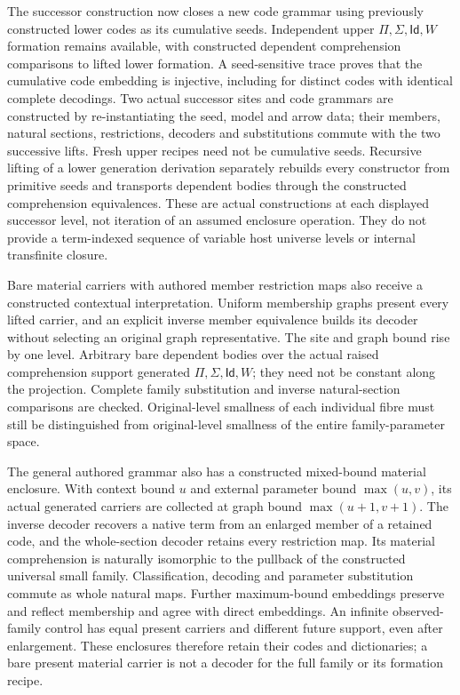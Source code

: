 \documentclass[11pt]{article}
\theoremstyle{definition}
\theoremstyle{remark}
\begin{document}
The successor construction now closes a new code grammar using previously
constructed lower codes as its cumulative seeds.  Independent upper
$\Pi,\Sigma,\mathsf{Id},W$ formation remains available, with constructed
dependent comprehension comparisons to lifted lower formation.  A
seed-sensitive trace proves that the cumulative code embedding is injective,
including for distinct codes with identical complete decodings.  Two actual
successor sites and code grammars are constructed by re-instantiating the
seed, model and arrow data; their members, natural sections, restrictions,
decoders and substitutions commute with the two successive lifts.  Fresh
upper recipes need not be cumulative seeds.  Recursive lifting of a lower
generation derivation separately rebuilds every constructor from primitive
seeds and transports dependent bodies through the constructed comprehension
equivalences.  These are actual constructions at each displayed successor
level, not iteration of an assumed enclosure operation.  They do not provide
a term-indexed sequence of variable host universe levels or internal
transfinite closure.

Bare material carriers with authored member restriction maps also receive a
constructed contextual interpretation.  Uniform membership graphs present
every lifted carrier, and an explicit inverse member equivalence builds its
decoder without selecting an original graph representative.  The site and
graph bound rise by one level.  Arbitrary bare dependent bodies over the
actual raised comprehension support generated $\Pi,\Sigma,\mathsf{Id},W$;
they need not be constant along the projection.  Complete family substitution
and inverse natural-section comparisons are checked.  Original-level
smallness of each individual fibre must still be distinguished from
original-level smallness of the entire family-parameter space.

The general authored grammar also has a constructed mixed-bound material
enclosure.  With context bound \(u\) and external parameter bound
\(\max(u,v)\), its actual generated carriers are collected at graph bound
\(\max(u+1,v+1)\).  The inverse decoder recovers a native term from an
enlarged member of a retained code, and the whole-section decoder retains
every restriction map.  Its material comprehension is naturally
isomorphic to the pullback of the constructed universal small family.
Classification, decoding and parameter substitution commute as whole
natural maps.  Further maximum-bound embeddings preserve and reflect
membership and agree with direct embeddings.  An infinite observed-family
control has equal present carriers and different future support, even
after enlargement.  These enclosures therefore retain their codes and
dictionaries; a bare present material carrier is not a decoder for the
full family or its formation recipe.
\end{document}

